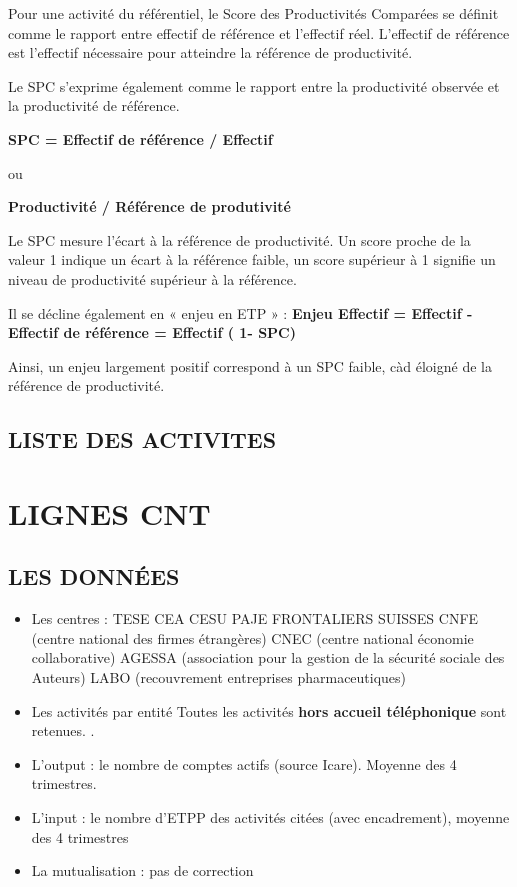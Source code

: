 \documentclass[
]{book}
\begin{document}
Pour une activité du référentiel, le Score des Productivités Comparées se définit comme le rapport entre effectif de référence et l'effectif réel. L'effectif de référence est l'effectif nécessaire pour atteindre la référence de productivité.

Le SPC s'exprime également comme le rapport entre la productivité observée et la productivité de référence.

\textbf{SPC = Effectif de référence / Effectif}

ou

\textbf{Productivité / Référence de produtivité}

Le SPC mesure l'écart à la référence de productivité. Un score proche de la valeur 1 indique un écart à la référence faible, un score supérieur à 1 signifie un niveau de productivité supérieur à la référence.

Il se décline également en « enjeu en ETP » :
\textbf{Enjeu Effectif = Effectif - Effectif de référence = Effectif ( 1- SPC)}

Ainsi, un enjeu largement positif correspond à un SPC faible, càd éloigné de la référence de productivité.

\hypertarget{liste-des-activites-5}{%
\section{LISTE DES ACTIVITES}\label{liste-des-activites-5}}

\hypertarget{lignes-cnt}{%
\chapter{LIGNES CNT}\label{lignes-cnt}}

\hypertarget{les-donnuxe9es-2}{%
\section{LES DONNÉES}\label{les-donnuxe9es-2}}

\begin{itemize}
\item
  Les centres :
  TESE
  CEA
  CESU
  PAJE
  FRONTALIERS SUISSES
  CNFE (centre national des firmes étrangères)
  CNEC (centre national économie collaborative)
  AGESSA (association pour la gestion de la sécurité sociale des Auteurs)
  LABO (recouvrement entreprises pharmaceutiques)
\item
  Les activités par entité
  Toutes les activités \textbf{hors accueil téléphonique} sont retenues.
  .
\item
  L'output : le nombre de comptes actifs (source Icare). Moyenne des 4 trimestres.
\item
  L'input : le nombre d'ETPP des activités citées (avec encadrement), moyenne des 4 trimestres
\item
  La mutualisation : pas de correction
\end{itemize}
\end{document}
